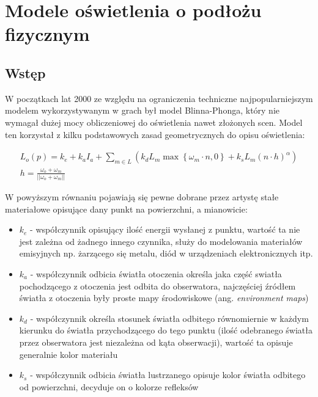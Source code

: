 \documentclass[../main.tex]{subfiles}
\begin{document}
\chapter{Modele oświetlenia o podłożu fizycznym}

\section{Wstęp}

W początkach lat 2000 ze względu na ograniczenia techniczne najpopularniejszym
modelem wykorzystywanym w grach był model Blinna-Phonga, który nie wymagał
dużej mocy obliczeniowej do oświetlenia nawet złożonych scen. Model ten
korzystał z kilku podstawowych zasad geometrycznych do opisu oświetlenia:

\begin{gather*}
  L_o(p) = k_e + k_a I_a +
    \sum_{m \in L} \left( {
      k_d L_m \max\left\{{ \omega_m \cdot n, 0 }\right\} +
      k_s L_m (n \cdot h)^{\alpha}
    } \right) \\
    h = \frac{\omega_o+\omega_m}{||\omega_o+\omega_m||}
\end{gather*}

W powyższym równaniu pojawiają się pewne dobrane przez artystę stałe materiałowe
opisujące dany punkt na powierzchni, a mianowicie:

\begin{itemize}

\item $k_e$ - współczynnik opisujący ilość energii wysłanej z punktu, wartość
  ta nie jest zależna od żadnego innego czynnika, służy do modelowania
  materiałów emisyjnych np. żarzącego się metalu, diód w urządzeniach
  elektronicznych itp.

\item $k_a$ - współczynnik odbicia światła otoczenia określa jaka część swiatła
  pochodzącego z otoczenia jest odbita do obserwatora, najczęściej źródłem
  światła z otoczenia były proste mapy środowiskowe (ang. \textit{environment
  maps})

\item $k_d$ - współczynnik określa stosunek światła odbitego równomiernie w
  każdym kierunku do światła przychodzącego do tego punktu (ilość odebranego
  światła przez obserwatora jest niezależna od kąta obserwacji), wartość ta
  opisuje generalnie kolor materiału

\item $k_s$ - współczynnik odbicia światła lustrzanego opisuje kolor światła
  odbitego od powierzchni, decyduje on o kolorze refleksów

\end{itemize}
\end{document}

